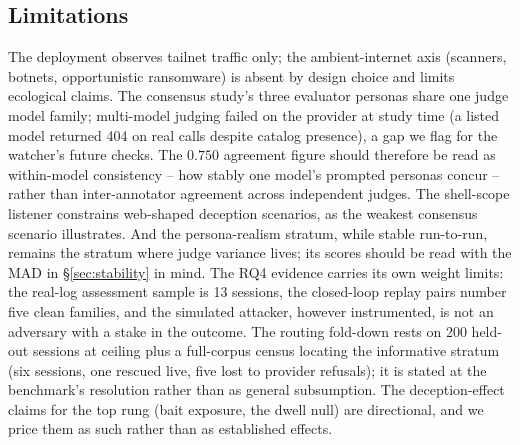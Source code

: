 \subsection{Limitations}
The deployment observes tailnet traffic only; the ambient-internet axis
(scanners, botnets, opportunistic ransomware) is absent by design choice
and limits ecological claims. The consensus study's three evaluator
personas share one judge model family; multi-model judging failed on the
provider at study time (a listed model returned 404 on real calls despite
catalog presence), a gap we flag for the watcher's future checks. The
$0.750$ agreement figure should therefore be read as within-model
consistency -- how stably one model's prompted personas concur -- rather
than inter-annotator agreement across independent judges. The shell-scope listener constrains web-shaped deception scenarios, as the
weakest consensus scenario illustrates. And the persona-realism stratum,
while stable run-to-run, remains the stratum where judge variance lives;
its scores should be read with the MAD in \S\ref{sec:stability} in mind.
The RQ4 evidence carries its own weight limits: the real-log assessment
sample is 13 sessions, the closed-loop replay pairs number five
clean families, and the simulated attacker, however instrumented, is not
an adversary with a stake in the outcome. The routing fold-down rests on
200 held-out sessions at ceiling plus a full-corpus census locating the
informative stratum (six sessions, one rescued live, five lost to
provider refusals); it is stated at the benchmark's resolution rather
than as general subsumption. The deception-effect claims for the
top rung (bait exposure, the dwell null) are directional, and we price
them as such rather than as established effects.
